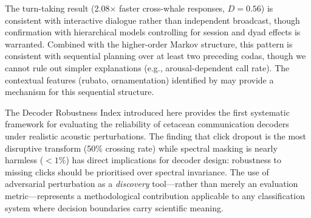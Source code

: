 \documentclass[11pt,a4paper]{article}
\begin{document}
The turn-taking result (2.08$\times$ faster cross-whale responses,
$D = 0.56$) is consistent with interactive dialogue rather than
independent broadcast, though confirmation with hierarchical models
controlling for session and dyad effects is warranted. Combined with
the higher-order Markov structure, this pattern is consistent with
sequential planning over at least two preceding codas, though we
cannot rule out simpler explanations (e.g., arousal-dependent call
rate). The contextual features (rubato, ornamentation) identified by
\citet{Sharma2024} may provide a mechanism for this sequential
structure.

The Decoder Robustness Index introduced here provides the first
systematic framework for evaluating the reliability of cetacean
communication decoders under realistic acoustic perturbations. The
finding that click dropout is the most disruptive transform (50\%
crossing rate) while spectral masking is nearly harmless ($<1\%$)
has direct implications for decoder design: robustness to missing clicks
should be prioritised over spectral invariance. The use of adversarial
perturbation as a \emph{discovery} tool---rather than merely an
evaluation metric---represents a methodological contribution applicable
to any classification system where decision boundaries carry scientific
meaning.
\end{document}
